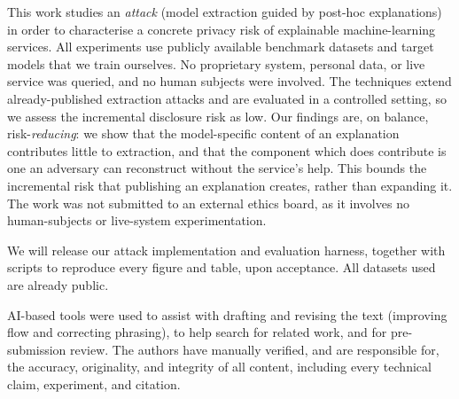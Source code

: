 \documentclass[sigconf,anonymous,review]{acmart}
\begin{document}
\begin{ethics}
This work studies an \emph{attack} (model extraction guided by post-hoc explanations) in order to characterise a concrete privacy risk of explainable
machine-learning services. All experiments use publicly available benchmark
datasets and target models that we train ourselves. No proprietary system, personal data,
or live service was queried, and no human subjects were involved. The techniques extend
already-published extraction attacks and are evaluated in a controlled setting, so we
assess the incremental disclosure risk as low. Our findings are, on balance,
risk-\emph{reducing}: we show that the model-specific content of an explanation contributes
little to extraction, and that the component which does contribute is one an adversary can
reconstruct without the service's help. This bounds the incremental risk that publishing an
explanation creates, rather than expanding it. The work was not submitted to an external ethics board, as it involves no
human-subjects or live-system experimentation.
\end{ethics}

\begin{openscience}
We will release our attack implementation and evaluation harness, together with scripts
to reproduce every figure and table, upon acceptance. All datasets used are already public.
\end{openscience}

\begin{ai}
AI-based tools were used to assist with drafting and revising the text (improving flow and
correcting phrasing), to help search for related work, and for pre-submission review. The
authors have manually verified, and are responsible for, the accuracy, originality, and
integrity of all content, including every technical claim, experiment, and citation.
\end{ai}




\end{document}
